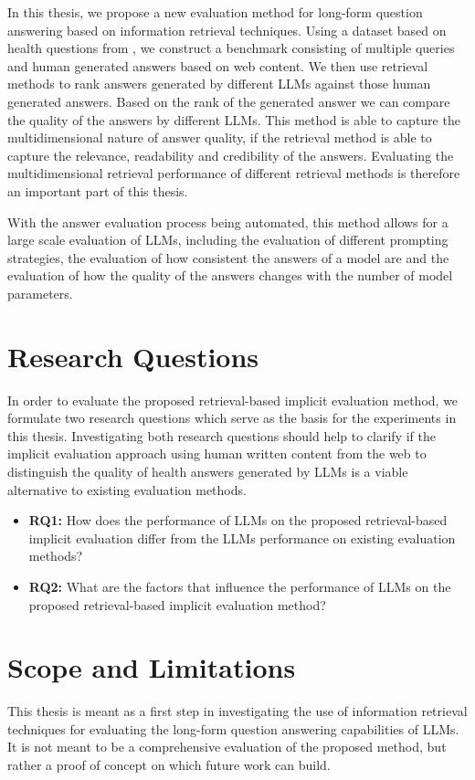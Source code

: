 In this thesis, we propose a new evaluation method for long-form question answering based on information retrieval techniques.
Using a dataset based on health questions from \cite{goeuriot:2021:Consumer}, we construct a benchmark consisting of multiple queries and human generated answers based on web content.
We then use retrieval methods to rank answers generated by different LLMs against those human generated answers.
Based on the rank of the generated answer we can compare the quality of the answers by different LLMs.
This method is able to capture the multidimensional nature of answer quality, if the retrieval method is able to capture the relevance, readability and credibility of the answers.
Evaluating the multidimensional retrieval performance of different retrieval methods is therefore an important part of this thesis.

With the answer evaluation process being automated, this method allows for a large scale evaluation of LLMs, including the evaluation of different prompting strategies, the evaluation of how consistent the answers of a model are and the evaluation of how the quality of the answers changes with the number of model parameters.


\section{Research Questions}\label{sec:research-question}
In order to evaluate the proposed retrieval-based implicit evaluation method, we formulate two research questions which serve as the basis for the experiments in this thesis.
Investigating both research questions should help to clarify if the implicit evaluation approach using human written content from the web to distinguish the quality of health answers generated by LLMs is a viable alternative to existing evaluation methods.

\begin{itemize}
    \item \textbf{RQ1:} How does the performance of LLMs on the proposed retrieval-based implicit evaluation differ from the LLMs performance on existing evaluation methods?%
    \item \textbf{RQ2:} What are the factors that influence the performance of LLMs on the proposed retrieval-based implicit evaluation method?
\end{itemize}


\section{Scope and Limitations}\label{sec:scope-and-limitations}
This thesis is meant as a first step in investigating the use of information retrieval techniques for evaluating the long-form question answering capabilities of LLMs.
It is not meant to be a comprehensive evaluation of the proposed method, but rather a proof of concept on which future work can build.

